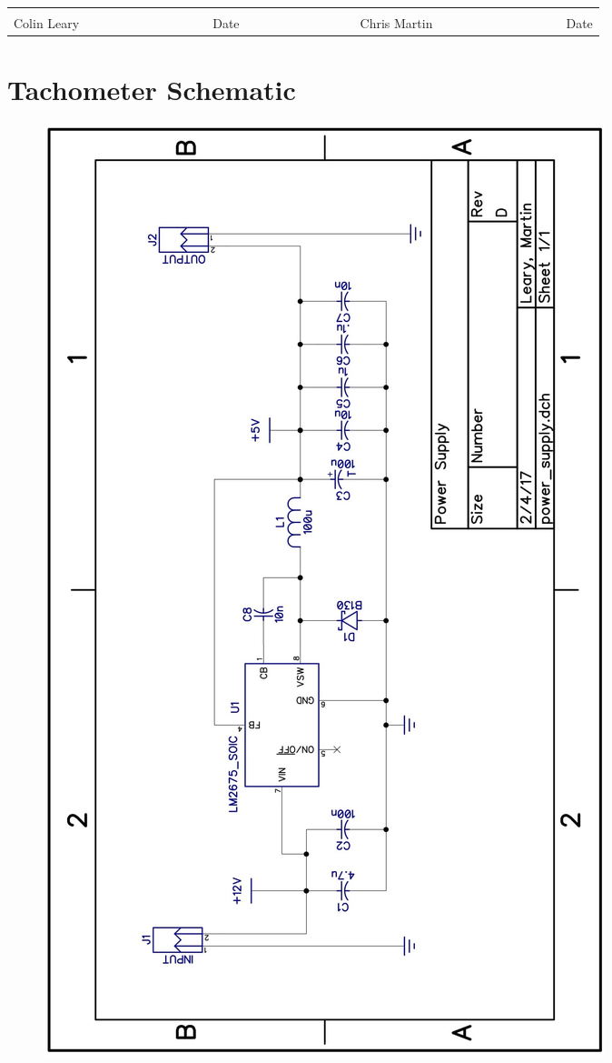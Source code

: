 \documentclass[11pt]{article}
\begin{document}
\begin{singlespacing}
\begin{table}[H]
\centering

\label{my-label}
\begin{tabular}{lllllll}
            &  &                          &  &              &  &                          \\ \cline{1-3} \cline{5-7} 
Colin Leary & ~~~~~~~~~~~~~~~~~ & \multicolumn{1}{r}{Date} & ~~~~~~~~~~~~~~~ & Chris Martin & ~~~~~~~~~~~~~~~~~ & \multicolumn{1}{r}{Date}
\end{tabular}
\end{table}

\end{singlespacing}


\section{Tachometer Schematic}
\label{app:schem}
\begin{figure}[H]
    \centering
    \includegraphics[width=.8\textwidth]{documents/ps_schem}
\end{figure}
\end{document}

